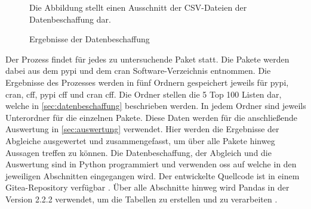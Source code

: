 \begin{figure}
    \centering
    \caption{Ergebnisse der Datenbeschaffung}
    \label{fig:datenbeschaffung_ergebnisse}
    \small
    \raggedright
    Die Abbildung stellt einen Ausschnitt der CSV-Dateien der Datenbeschaffung dar.
\end{figure}

Der Prozess findet für jedes zu untersuchende Paket statt.
Die Pakete werden dabei aus dem \gls{pypi} und dem \gls{cran} Software-Verzeichnis entnommen.
Die Ergebnisse des Prozesses werden in fünf Ordnern gespeichert jeweils für \gls{pypi}, \gls{cran}, \gls{cff}, \gls{pypi} \gls{cff} und \gls{cran} \gls{cff}.
Die Ordner stellen die 5 Top 100 Listen dar, welche in \autoref{sec:datenbeschaffung} beschrieben werden.
In jedem Ordner sind jeweils Unterordner für die einzelnen Pakete.
Diese Daten werden für die anschließende Auswertung in \autoref{sec:auswertung} verwendet.
Hier werden die Ergebnisse der Abgleiche ausgewertet und zusammengefasst, um über alle Pakete hinweg Aussagen treffen zu können.
Die Datenbeschaffung, der Abgleich und die Auswertung sind in Python programmiert und verwenden \gls{oss} auf welche in den jeweiligen Abschnitten eingegangen wird.
Der entwickelte Quellcode ist in einem Gitea-Repository verfügbar \autocite{jahrens_t20240710-softwareauthors-kj_2024}.
Über alle Abschnitte hinweg wird Pandas in der Version 2.2.2 verwendet, um die Tabellen zu erstellen und zu verarbeiten \autocite{the_pandas_development_team_pandas-devpandas_2024}.




